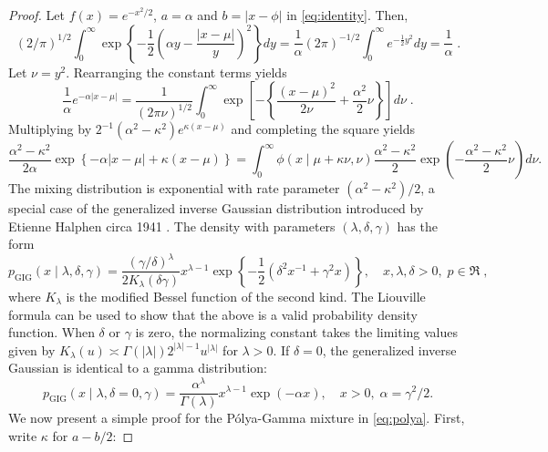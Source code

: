 \documentclass[ECP]{ejpecp} %
\def\PG{P{\'o}lya-Gamma}
\newcommand{\half}{\frac{1}{2}}
\begin{document}
\begin{proof}
Let $f(x) = e^{-x^2/2}$, $a = \alpha$ and $b = |x-\phi|$ in \eqref{eq:identity}. Then,
\[
(2/\pi)^{1/2} \int_{0}^{\infty} \exp\left\{-\half \left(\alpha y - \frac{|x-\mu|}{y} \right)^2 \right\} dy = \frac{1}{\alpha} (2\pi)^{-1/2} \int_0^{\infty} e^{-\half y^2} dy 
= \frac{1}{\alpha} \;.
\]
Let $\nu = y^2$. Rearranging the constant terms yields
\[
\frac{1}{\alpha} e^{-\alpha|x-\mu|} = \frac{1}{(2 \pi \nu)^{1/2}} \int_{0}^{\infty} \exp\left[-\left\{ \frac{(x-\mu)^2}{2\nu} + \frac{\alpha^2}{2} \nu \right\} \right]
d\nu \;.
\]
Multiplying by $2^{-1}(\alpha^2-\kappa^2) e^{\kappa(x-\mu)}$ and completing the square yields
\begin{equation*}
  \frac{\alpha^2-\kappa^2}{2\alpha} \exp\left\{-\alpha|x-\mu| + \kappa(x-\mu)\right\} 
  = \int_0^{\infty} \phi(x \mid \mu + \kappa \nu, \nu) 
  \frac{\alpha^2-\kappa^2}{2} \exp\left(-\frac{\alpha^2-\kappa^2}{2} \nu \right) d \nu. 
\end{equation*}
The mixing distribution is exponential with rate parameter $(\alpha^2-\kappa^2)/2$, a special case of the generalized inverse Gaussian distribution introduced by Etienne Halphen circa 1941 \cite{seshadri1997halphen}. The density with parameters $(\lambda, \delta, \gamma)$ has the form 
\begin{equation*}
  p_{\mathrm{GIG}}(x \mid \lambda, \delta, \gamma) = \frac{(\gamma/\delta)^{\lambda}}{2 K_{\lambda}(\delta \gamma)} x^{\lambda-1} 
  \exp\left\{ -\half (\delta^2 x^{-1} + \gamma^2 x )\right\}, \quad x, \lambda, \delta > 0,\;  p \in \Re \;,
\end{equation*}
where $K_{\lambda}$ is the modified Bessel function of the second kind.  The Liouville formula can be used to show that the above is a valid probability density
function.  When $\delta$ or $\gamma$ is zero, the normalizing constant takes the limiting values given by $K_{\lambda}(u) \asymp \Gamma(|\lambda|) 2^{|\lambda|-1} u^{|\lambda|}$ for $\lambda > 0$.  If $\delta=0$, the generalized inverse Gaussian is identical to a gamma distribution:
\[
p_{\mathrm{GIG}}(x \mid \lambda, \delta = 0 , \gamma) = \frac{\alpha^{\lambda}}{\Gamma(\lambda)} x^{\lambda-1} \exp(-\alpha x), \quad x > 0,\; \alpha = \gamma^2 / 2.
\]
%
We now present a simple proof for the \PG{} mixture in \eqref{eq:polya}. First, write $\kappa$ for $a-b/2$: 

\end{proof}
\end{document}
